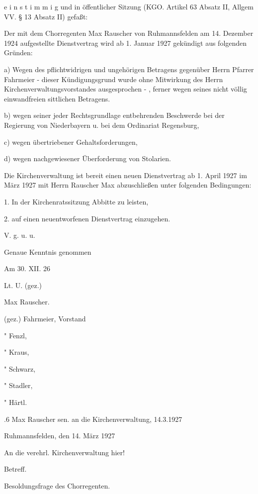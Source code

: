 \documentclass{book}
\begin{document}
e i n s t i m m i g und in öffentlicher Sitzung (KGO. Artikel 63 Absatz II,
Allgem VV. § 13 Absatz II) gefaßt:



Der mit dem Chorregenten Max Rauscher von Ruhmannsfelden am 14. Dezember 1924
aufgestellte Dienstvertrag wird ab 1. Januar 1927 gekündigt aus folgenden
Gründen:

a) Wegen des pflichtwidrigen und ungehörigen Betragens gegenüber Herrn Pfarrer
Fahrmeier - dieser  Kündigungsgrund wurde ohne Mitwirkung des Herrn
Kirchenverwaltungsvorstandes ausgesprochen - , ferner wegen seines nicht völlig
einwandfreien sittlichen Betragens.

b) wegen seiner jeder Rechtsgrundlage entbehrenden Beschwerde bei der Regierung
von Niederbayern u. bei dem Ordinariat Regensburg,

c) wegen übertriebener Gehaltsforderungen,

d) wegen nachgewiesener Überforderung von Stolarien.

Die Kirchenverwaltung ist bereit einen neuen Dienstvertrag ab 1. April 1927 im
März 1927 mit Herrn Rauscher Max abzuschließen unter folgenden Bedingungen:

1. In der Kirchenratssitzung Abbitte zu leisten,

2. auf einen neuentworfenen Dienstvertrag einzugehen.

V. g. u. u.



Genaue Kenntnis genommen

Am 30. XII. 26

Lt. U. (gez.)

Max Rauscher.



(gez.) Fahrmeier, Vorstand

   "     Fenzl,

   "     Kraus,

   "     Schwarz,

   "     Stadler,

   "     Härtl.

.6 Max Rauscher sen. an die Kirchenverwaltung, 14.3.1927

Ruhmannsfelden, den 14. März 1927



An die verehrl. Kirchenverwaltung hier!



Betreff.

Besoldungsfrage des Chorregenten.
\end{document}

